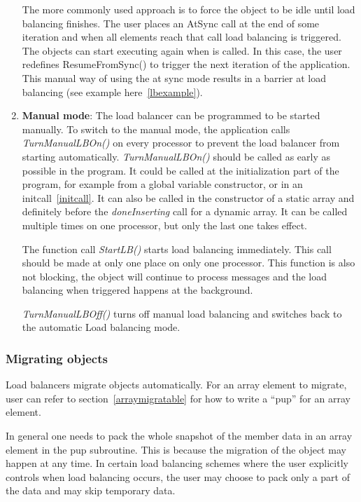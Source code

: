 \begin{enumerate}
The more commonly used approach is to force the object to be idle until load
balancing finishes. The user places an AtSync call at the end of some iteration
and when all elements reach that call load balancing is triggered. The objects
can start executing again when  is called. In this case,
the user redefines ResumeFromSync() to trigger the next iteration of the
application. This manual way of using the at sync mode results in a barrier at
load balancing (see example here~\ref{lbexample}).
%
\item {\bf Manual mode}: The load balancer can be programmed to be started
manually. To switch to the manual mode, the application calls {\em TurnManualLBOn()}
on every processor to prevent the load balancer from starting automatically. {\em
TurnManualLBOn()} should be called as early as possible in the program. It
could be called at the initialization part of the program, for example from a
global variable constructor, or in an initcall~\ref{initcall}.  It can also be
called in the constructor of a static array and definitely before the {\em
doneInserting} call for a dynamic array.  It can be called multiple times on
one processor, but only the last one takes effect.

The function call {\em StartLB()} starts load balancing immediately. This call
should be made at only one place on only one processor. This function is also
not blocking, the object will continue to process messages and the load
balancing when triggered happens at the background.

{\em TurnManualLBOff()} turns off manual load balancing and switches back to
the automatic Load balancing mode.
%
\end{enumerate}

\subsubsection{Migrating objects}

\label{lbmigobj}

Load balancers migrate objects automatically.
For an array element to migrate, user can refer to section~\ref{arraymigratable}
for how to write a ``pup'' for an array element.

In general one needs to pack the whole snapshot of the member data in an 
array element in the pup subroutine. This is because the migration of
the object may happen at any time. In certain load balancing schemes where
 the user explicitly controls when load balancing occurs, the user may choose
to pack only a part of the data and may skip temporary data.

